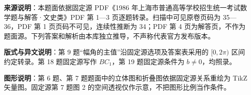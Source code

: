 

\begin{gktip}
\textbf{来源说明}：本题面依据固定源 PDF《1986 年上海市普通高等学校招生统一考试数学题与解答·文史类》PDF 第 1—3 页逐题转录。扫描中可见原卷页码为 35—36，PDF 第 1 页页码不可见，连续性推断为 34；PDF 第 4 页为解答页，不作为题面源。下列答案和解析由本库独立推导，不声称代表官方发布版本。

\textbf{版式与异文说明}：第 9 题“幅角的主值”沿固定源选项及答案表采用的 $[0,2\pi)$ 区间约定转录。第 18 题固定源写作 $BC_1$，第 19 题固定源条件为 $b\ne0$，均照录。

\textbf{图形说明}：第 6 题、第 7 题题面中的立体图和折叠图依据固定源关系重绘为 TikZ 矢量图。固定源第 7 题图 2 的空间透视仅作示意，不把图形比例当作条件。
\end{gktip}

